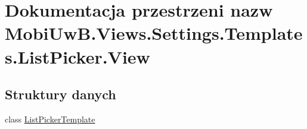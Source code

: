\hypertarget{a00285}{}\section{Dokumentacja przestrzeni nazw Mobi\+Uw\+B.\+Views.\+Settings.\+Templates.\+List\+Picker.\+View}
\label{a00285}
\subsection*{Struktury danych}
\begin{DoxyCompactItemize}
\item 
class \hyperlink{a00036}{List\+Picker\+Template}
\end{DoxyCompactItemize}
